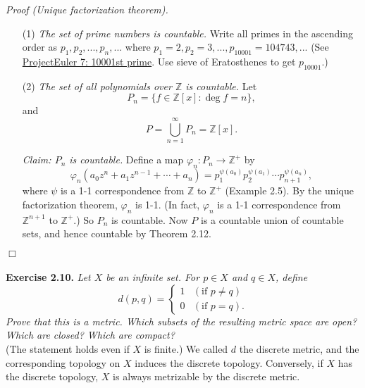 \documentclass{article}
\begin{document}
\emph{Proof (Unique factorization theorem).}
\begin{enumerate}
\item[(1)]
\emph{The set of prime numbers is countable.}
Write all primes in the ascending order as $p_1, p_2, ..., p_n, ...$
where $p_1 = 2, p_2 = 3, ..., p_{10001} = 104743, ...$
(See \href{https://projecteuler.net/problem=7}{ProjectEuler 7: 10001st prime}.
Use sieve of Eratosthenes to get $p_{10001}$.)
\item[(2)]
\emph{The set of all polynomials over $\mathbb{Z}$ is countable.}
Let
$$P_n = \{ f \in \mathbb{Z}[x] : \deg f = n \},$$
and
$$P = \bigcup_{n = 1}^{\infty} P_n = \mathbb{Z}[x].$$

\emph{Claim: $P_n$ is countable.}
Define a map $\varphi_n: P_n \rightarrow \mathbb{Z}^+$ by
$$\varphi_n(a_0 z^n + a_1 z^{n-1} + \cdots + a_n)
= p_1^{\psi(a_0)} p_2^{\psi(a_1)} \cdots p_{n+1}^{\psi(a_n)},$$
where $\psi$ is a 1-1 correspondence from $\mathbb{Z}$ to $\mathbb{Z}^+$ (Example 2.5).
By the unique factorization theorem, $\varphi_n$ is 1-1.
(In fact, $\varphi_n$ is a 1-1 correspondence from $\mathbb{Z}^{n+1}$ to $\mathbb{Z}^+$.)
So $P_n$ is countable.
Now $P$ is a countable union of countable sets,
and hence countable by Theorem 2.12.
\end{enumerate}
$\Box$ \\\\



\textbf{Exercise 2.10.}
\emph{Let $X$ be an infinite set. For $p \in X$ and $q \in X$, define
\begin{equation*}
  d(p, q) =
    \begin{cases}
      1 & (\text{if } p \neq q) \\
      0 & (\text{if } p = q).
    \end{cases}
\end{equation*}
Prove that this is a metric.
Which subsets of the resulting metric space are open?
Which are closed?
Which are compact?} \\

(The statement holds even if $X$ is finite.)
We called $d$ the discrete metric,
and the corresponding topology on $X$ induces the discrete topology.
Conversely, if $X$ has the discrete topology, $X$ is always metrizable by the discrete metric. \\
\end{document}
